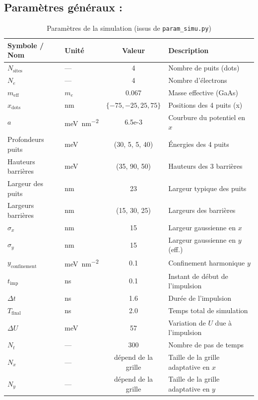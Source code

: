 \documentclass{article}
\begin{document}
\subsection{Paramètres généraux :}
\begin{table}[H]
  \centering
  \caption{Paramètres de la simulation (issus de \texttt{param\_simu.py})}
  \label{tab:params}
  \begin{tabularx}{0.95\linewidth}{
      >{\raggedright\arraybackslash}p{4cm}
      >{\raggedright\arraybackslash}p{2.5cm}
      S[table-format=3.3]
      >{\raggedright\arraybackslash}X
  }
    \toprule
    \textbf{Symbole / Nom} & \textbf{Unité} & \textbf{Valeur} & \textbf{Description} \\
    \midrule
    $N_{\text{sites}}$       & — & 4 & Nombre de puits (dots) \\
    $N_{e}$                  & — & 4 & Nombre d’électrons \\
    $m_{\text{eff}}$         & $m_e$ & 0.067 & Masse effective (GaAs) \\
    $x_{\text{dots}}$        & \si{\nano\metre} & $\{-75,-25,25,75\}$ & Positions des 4 puits (x) \\
    $a$                      & \si{\milli\electronvolt\per\nano\metre\squared} & 6.5e-3 & Courbure du potentiel en $x$ \\
    Profondeurs puits        & \si{\milli\electronvolt} & (30, 5, 5, 40) & Énergies des 4 puits \\
    Hauteurs barrières       & \si{\milli\electronvolt} & (35, 90, 50) & Hauteurs des 3 barrières \\
    Largeur des puits        & \si{\nano\metre} & 23 & Largeur typique des puits \\
    Largeurs barrières       & \si{\nano\metre} & (15, 30, 25) & Largeurs des barrières \\
    $\sigma_x$               & \si{\nano\metre} & 15 & Largeur gaussienne en $x$ \\
    $\sigma_y$               & \si{\nano\metre} & 15 & Largeur gaussienne en $y$ (eff.) \\
    $y_{\text{confinement}}$ & \si{\milli\electronvolt\per\nano\metre\squared} & 0.1 & Confinement harmonique $y$ \\
    $t_{\text{imp}}$         & \si{\nano\second} & 0.1 & Instant de début de l’impulsion \\
    $\Delta t$               & \si{\nano\second} & 1.6 & Durée de l’impulsion \\
    $T_{\text{final}}$       & \si{\nano\second} & 2.0 & Temps total de simulation \\
    $\Delta U$               & \si{\milli\electronvolt} & 57 & Variation de $U$ due à l’impulsion \\
    $N_t$                    & — & 300 & Nombre de pas de temps \\
    $N_x$                    & — & dépend de la grille & Taille de la grille adaptative en $x$ \\
    $N_y$                    & — & dépend de la grille & Taille de la grille adaptative en $y$ \\
    \bottomrule
  \end{tabularx}
\end{table}
\end{document}
